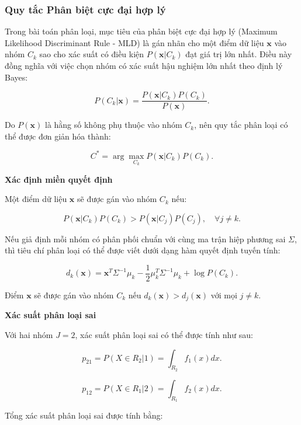 \subsubsection{Quy tắc Phân biệt cực đại hợp lý}

Trong bài toán phân loại, mục tiêu của phân biệt cực đại hợp lý (Maximum Likelihood Discriminant Rule - MLD) là gán nhãn cho một điểm dữ liệu \( \mathbf{x} \) vào nhóm \( C_k \) sao cho xác suất có điều kiện \( P(\mathbf{x} | C_k) \) đạt giá trị lớn nhất. Điều này đồng nghĩa với việc chọn nhóm có xác suất hậu nghiệm lớn nhất theo định lý Bayes:

\[
P(C_k | \mathbf{x}) = \frac{P(\mathbf{x} | C_k) P(C_k)}{P(\mathbf{x})}.
\]

Do \( P(\mathbf{x}) \) là hằng số không phụ thuộc vào nhóm \( C_k \), nên quy tắc phân loại có thể được đơn giản hóa thành:

\begin{equation}
C^* = \arg\max_{C_k} P(\mathbf{x} | C_k) P(C_k).
\tag{2.2.10}
\end{equation}

\textbf{Xác định miền quyết định}

Một điểm dữ liệu \( \mathbf{x} \) sẽ được gán vào nhóm \( C_k \) nếu:

\begin{equation}
P(\mathbf{x} | C_k) P(C_k) > P(\mathbf{x} | C_j) P(C_j), \quad \forall j \neq k.
\tag{2.2.11}
\end{equation}

Nếu giả định mỗi nhóm có phân phối chuẩn với cùng ma trận hiệp phương sai \( \Sigma \), thì tiêu chí phân loại có thể được viết dưới dạng hàm quyết định tuyến tính:

\begin{equation}
d_k(\mathbf{x}) = \mathbf{x}^T \Sigma^{-1} \mu_k - \frac{1}{2} \mu_k^T \Sigma^{-1} \mu_k + \log P(C_k).
\tag{2.2.12}
\end{equation}

Điểm \( \mathbf{x} \) sẽ được gán vào nhóm \( C_k \) nếu \( d_k(\mathbf{x}) > d_j(\mathbf{x}) \) với mọi \( j \neq k \).

\textbf{Xác suất phân loại sai}

Với hai nhóm \( J = 2 \), xác suất phân loại sai có thể được tính như sau:

\[
p_{21} = P(X \in R_2 | 1) = \int_{R_2} f_1(x) dx.
\]

\[
p_{12} = P(X \in R_1 | 2) = \int_{R_1} f_2(x) dx.
\]

Tổng xác suất phân loại sai được tính bằng:

